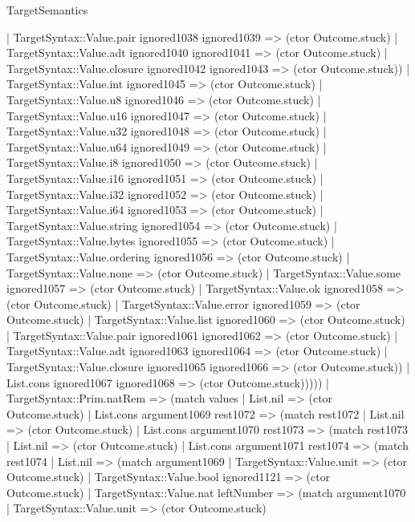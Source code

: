 \begin{lexlean}{TargetSemantics}
\begin{semanticmodule}
{                | TargetSyntax::Value.pair ignored1038 ignored1039 => (ctor Outcome.stuck)
                | TargetSyntax::Value.adt ignored1040 ignored1041 => (ctor Outcome.stuck)
                | TargetSyntax::Value.closure ignored1042 ignored1043 => (ctor Outcome.stuck))
              | TargetSyntax::Value.int ignored1045 => (ctor Outcome.stuck)
              | TargetSyntax::Value.u8 ignored1046 => (ctor Outcome.stuck)
              | TargetSyntax::Value.u16 ignored1047 => (ctor Outcome.stuck)
              | TargetSyntax::Value.u32 ignored1048 => (ctor Outcome.stuck)
              | TargetSyntax::Value.u64 ignored1049 => (ctor Outcome.stuck)
              | TargetSyntax::Value.i8 ignored1050 => (ctor Outcome.stuck)
              | TargetSyntax::Value.i16 ignored1051 => (ctor Outcome.stuck)
              | TargetSyntax::Value.i32 ignored1052 => (ctor Outcome.stuck)
              | TargetSyntax::Value.i64 ignored1053 => (ctor Outcome.stuck)
              | TargetSyntax::Value.string ignored1054 => (ctor Outcome.stuck)
              | TargetSyntax::Value.bytes ignored1055 => (ctor Outcome.stuck)
              | TargetSyntax::Value.ordering ignored1056 => (ctor Outcome.stuck)
              | TargetSyntax::Value.none => (ctor Outcome.stuck)
              | TargetSyntax::Value.some ignored1057 => (ctor Outcome.stuck)
              | TargetSyntax::Value.ok ignored1058 => (ctor Outcome.stuck)
              | TargetSyntax::Value.error ignored1059 => (ctor Outcome.stuck)
              | TargetSyntax::Value.list ignored1060 => (ctor Outcome.stuck)
              | TargetSyntax::Value.pair ignored1061 ignored1062 => (ctor Outcome.stuck)
              | TargetSyntax::Value.adt ignored1063 ignored1064 => (ctor Outcome.stuck)
              | TargetSyntax::Value.closure ignored1065 ignored1066 => (ctor Outcome.stuck))
            | List.cons ignored1067 ignored1068 => (ctor Outcome.stuck)))))
    | TargetSyntax::Prim.natRem => (match values
      | List.nil => (ctor Outcome.stuck)
      | List.cons argument1069 rest1072 => (match rest1072
        | List.nil => (ctor Outcome.stuck)
        | List.cons argument1070 rest1073 => (match rest1073
          | List.nil => (ctor Outcome.stuck)
          | List.cons argument1071 rest1074 => (match rest1074
            | List.nil => (match argument1069
              | TargetSyntax::Value.unit => (ctor Outcome.stuck)
              | TargetSyntax::Value.bool ignored1121 => (ctor Outcome.stuck)
              | TargetSyntax::Value.nat leftNumber => (match argument1070
                | TargetSyntax::Value.unit => (ctor Outcome.stuck)
}
\end{semanticmodule}
\end{lexlean}
